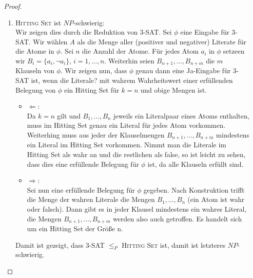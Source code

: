 \documentclass[a4paper]{scrartcl}
\begin{document}
\begin{enumerate}[label=\bfseries \arabic*.]
\begin{enumerate}
\begin{proof}
\begin{enumerate}
                \item \textsc{Hitting Set} ist $NP$-schwierig: \\
                    Wir zeigen dies durch die Reduktion von 3-SAT.
                    Sei $\phi$ eine Eingabe für 3-SAT. Wir wählen $A$ als die
                    Menge aller (positiver und negativer) Literate für die
                    Atome in $\phi$.
                    Sei $n$ die Anzahl der Atome. Für jedes Atom $a_i$ in
                    $\phi$ setzeen wir $B_i = \{a_i, \lnot a_i\}$, $i = 1,
                    \dotsc, n$. Weiterhin seien $B_{n+1}, \dotsc, B_{n+m}$ die
                    $m$ Klauseln von $\phi$. Wir zeigen nun, dass $\phi$ genau
                    dann eine Ja-Eingabe für 3-SAT ist, wenn die Literale? mit
                    wahrem Wahrheitswert einer erfüllenden Belegung von $\phi$
                    ein Hitting Set für $k = n$ und obige Mengen ist.
                    \begin{itemize}
                        \item $\Leftarrow$: \\
                            Da $k = n$ gilt und $B_1, \dotsc, B_n$ jeweils ein
                            Literalpaar eines Atoms enthalten, muss im Hitting
                            Set genau ein Literal für jedes Atom vorkommen.
                            Weiterhing muss aus jeder der Klauselmengen
                            $B_{n+1}, \dotsc, B_{n+m}$ mindestens ein Literal
                            im Hitting Set vorkommen. Nimmt man die Literale im
                            Hitting Set als wahr an und die restlichen als
                            false, so ist leicht zu sehen, dass dies eine
                            erfüllende Belegung für $\phi$ ist, da alle
                            Klauseln erfüllt sind.

                        \item $\Rightarrow$: \\
                            Sei nun eine erfüllende Belegung für $\phi$
                            gegeben. Nach Konstruktion trifft die Menge der
                            wahren Literale die Mengen $B_1, \dotsc, B_n$ (ein
                            Atom ist wahr oder falsch). Dann gibt es in jeder
                            Klausel mindestens ein wahres Literal, die Mengen
                            $B_{n+1}, \dotsc, B_{n+m}$ werden also auch
                            getroffen. Es handelt sich um ein Hitting Set der
                            Größe n.
                    \end{itemize}
                    Damit ist gezeigt, dass 3-SAT $\leq_P$ \textsc{Hitting Set}
                    ist, damit ist letzteres $NP$-schwierig.


\end{enumerate}
\end{proof}
\end{enumerate}
\end{enumerate}
\end{document}
